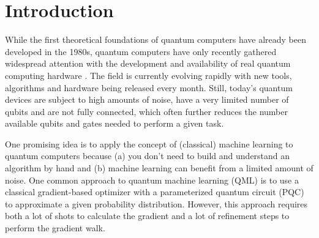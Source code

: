 \chapter{Introduction}
\label{chap:intro}


While the first theoretical foundations of quantum computers have already been
developed in the 1980s, quantum computers have only recently gathered widespread
attention with the development and availability of real quantum computing
hardware \cite{nielsen_quantum_2007,hidary_quantum_2021}.
The field is currently evolving rapidly with new tools, algorithms and hardware
being released every month. %
Still, today's quantum devices are subject to high amounts of noise, have a very
limited number of qubits and are not fully connected, which often further
reduces the number available qubits and gates needed to perform a given task.

One promising idea is to apply the concept of (classical) machine learning to
quantum computers because (a) you don't need to build and understand an
algorithm by hand and (b) machine learning can benefit from a limited amount of
noise.
One common approach to quantum machine learning (QML) is to use a classical
gradient-based optimizer with a parameterized quantum circuit (PQC) to
approximate a given probability distribution.
However, this approach requires both a lot of shots to calculate the gradient
and a lot of refinement steps to perform the gradient walk.

